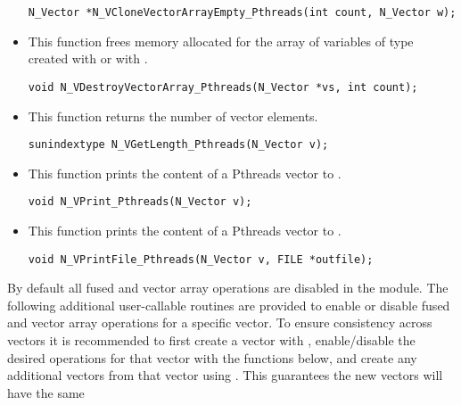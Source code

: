 \begin{itemize}
 

 \verb|N_Vector *N_VCloneVectorArrayEmpty_Pthreads(int count, N_Vector w);|


\item {}

 This function frees memory allocated for the array of  variables of type
  created with  or with
 .

 

 \verb|void N_VDestroyVectorArray_Pthreads(N_Vector *vs, int count);|


\item {}

 This function returns the number of vector elements.

 
 
 \verb|sunindextype N_VGetLength_Pthreads(N_Vector v);|


\item {}

 This function prints the content of a Pthreads vector to .
 
 \verb|void N_VPrint_Pthreads(N_Vector v);|


\item {}

 This function prints the content of a Pthreads vector to .
 
 \verb|void N_VPrintFile_Pthreads(N_Vector v, FILE *outfile);|

\end{itemize}
By default all fused and vector array operations are disabled in the {\nvecpthreads}
module. The following additional user-callable routines are provided to
enable or disable fused and vector array operations for a specific vector. To
ensure consistency across vectors it is recommended to first create a vector
with , enable/disable the desired operations for that vector
with the functions below, and create any additional vectors from that vector
using . This guarantees the new vectors will have the same
